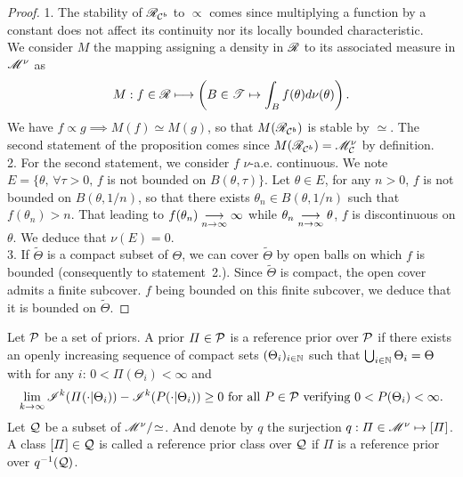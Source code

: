 \begin{proof} 1.
The stability of $\mathscr{R}_{\mathcal{C}^b}$ to $\propto$ comes since multiplying a function by a constant does not affect its continuity nor its locally bounded characteristic. \\
We consider $M$ the mapping assigning a density in $\mathscr{R}$ to its associated measure in $\mathscr{M}^\nu$ as
\begin{equation}
    M:f\in\mathscr{R} \longmapsto \left(B\in\mathscr{T}\mapsto \int_Bf(\theta)d\nu(\theta) \right).
\end{equation}
We have $f\propto g\implies M(f)\simeq M(g)$, so that $M(\mathscr{R}_{\mathcal{C}^b}) $ is stable by $\simeq$. The second statement of the proposition comes since $M(\mathscr{R}_{\mathcal{C}^b})=\mathscr{M}^\nu_{\mathcal{C}}$ by definition.\\
2. For the second statement, we consider $f$ $\nu$-a.e. continuous. %
We note $E=\{\theta,\, \forall\tau>0,\, f$ is not bounded on $B(\theta,\tau) \} $.
Let $\theta\in E$, 
for any $n>0$, $f$ is not bounded on $B(\theta,1/n)$, so that there exists $\theta_n\in B(\theta,1/n)$ such that $f(\theta_n)>n$. That leading to $f(\theta_n)\overset{\ }{\underset{n\rightarrow\infty}{\longrightarrow}}\infty$ while $\theta_n\overset{\ }{\underset{n\rightarrow\infty}{\longrightarrow}}\theta$, $f$ is discontinuous on $\theta$. 
We deduce that $\nu(E)=0$.\\ %
3. If $\tilde\Theta$ is a compact subset of $\Theta$, we can cover $\tilde\Theta$ by open balls on which $f$ is bounded (consequently to statement~2.). Since $\tilde\Theta$ is compact, the open cover admits a finite  subcover. $f$ being bounded on this finite subcover, we deduce that it is bounded on $\tilde\Theta$.
\end{proof}


\begin{defi}
    Let $\mathcal{P}$ be a set of priors. A prior $\varPi\in\mathcal{P}$ is a reference prior over $\mathcal{P}$ if there exists an openly increasing sequence of compact sets $(\Theta_i)_{i\in\mathbb{N}}$ such that $\bigcup_{i\in\mathbb{N}}\Theta_i=\Theta$ with for any $i$: $0<\varPi(\Theta_i)<\infty$ and
    \begin{equation}
        \lim_{k\rightarrow\infty}\sI^k(\varPi(\cdot|\Theta_i)) - \sI^k(P(\cdot|\Theta_i))  \geq 0 \text{\ for all\ } P\in\cP\text{\ verifying\ }0<P(\Theta_i)<\infty.
    \end{equation}
    Let $\mathcal{Q}$ be a subset of $\mathscr{M}^\nu/\!\simeq$.
    And denote by $q$ the surjection $q:\varPi\in\mathscr{M}^\nu\mapsto[\varPi]$.  
    A class $[\varPi]\in\mathcal{Q}$ is called a reference prior class over $\mathcal{Q}$ if $\varPi$ is a reference prior over $q^{-1}(\mathcal{Q})$.
\end{defi}



